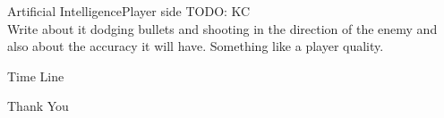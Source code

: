 \documentclass{beamer}
\begin{document}
\begin{frame}{Artificial Intelligence}{Player side}
	TODO: KC \\
	Write about it dodging bullets and shooting in the direction of the enemy and also about the accuracy it will have. Something like a player quality.
\end{frame}


\begin{frame}{Time Line}{}
	  
\end{frame}

\begin{frame}
\vfill
\begin{center}
\huge{Thank You}
\end{center}
\vfill
\end{frame}
\end{document}
